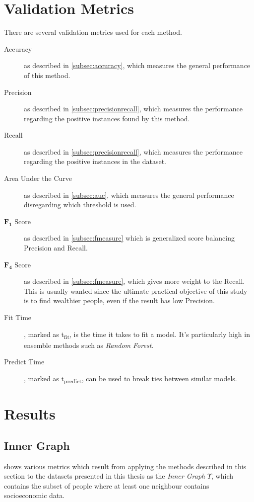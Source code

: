 \section{Validation Metrics}
\label{subsec:validationmetrics}
There are several validation metrics used for each method.

\begin{description}
	\item[Accuracy] as described in \cref{subsec:accuracy}, which measures the general performance of this method.
	\item[Precision] as described in \cref{subsec:precisionrecall}, which measures the performance regarding the positive instances found by this method.
	\item[Recall] as described in \cref{subsec:precisionrecall}, which measures the performance regarding the positive instances in the dataset.
	\item[Area Under the Curve] as described in \cref{subsec:auc}, which measures the general performance disregarding which threshold is used.
	\item[$\mathbf{F_1}$ Score] as described in \cref{subsec:fmeasure} which is generalized score balancing Precision and Recall.
	\item[$\mathbf{F_4}$ Score] as described in \cref{subsec:fmeasure}, which gives more weight to the Recall. This is usually wanted since the ultimate practical objective of this study is to find wealthier people, even if the result has low Precision.
	\item[Fit Time], marked as t\textsubscript{fit}, is the time it takes to fit a model. It's particularly high in ensemble methods such as \emph{Random Forest}.
	\item[Predict Time], marked as t\textsubscript{predict}, can be used to break ties between similar models.
\end{description}

\section{Results}
\label{sec:comparison_results}

\subsection{Inner Graph}
\label{subsec:comparison_inner_graph}

 shows various metrics which result from applying the methods described in this section to the datasets presented in this thesis as the \emph{Inner Graph} $\Upsilon$, which contains the subset of people where at least one neighbour contains socioeconomic data.

